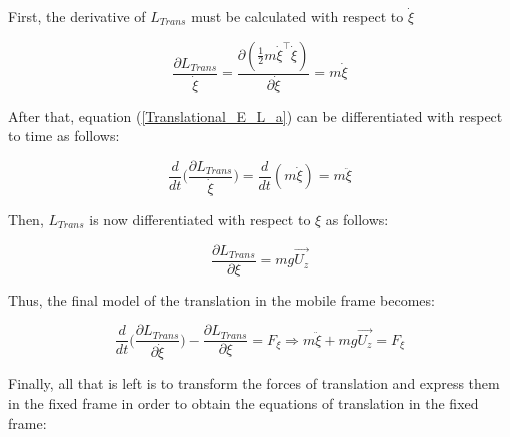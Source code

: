 \documentclass{thesisreport}
\begin{document}
First, the derivative of $L_{Trans}$ must be calculated with respect to $\dot{\xi}$

\begin{equation}\label{Translational_E_L_a}
	\frac{\partial L_{Trans}}{\dot{\xi}} = \frac{\partial (\frac{1}{2} m \dot{\xi}^{\intercal} \dot{\xi})}{\partial \dot{\xi}}= m \dot{\xi}
\end{equation}

After that, equation (\ref{Translational_E_L_a}) can be differentiated with respect to time as follows: 

\begin{equation}
	\frac{d}{dt}\bigg( \frac{\partial L_{Trans}}{\dot{\xi}} \bigg) = \frac{d}{dt}(m \dot{\xi}) = m \ddot{\xi}
\end{equation} 

Then, $L_{Trans}$ is now differentiated with respect to $\xi$ as follows:

\begin{equation}
	\frac{\partial L_{Trans}}{\partial \xi}=mg\overrightarrow{U_z}
\end{equation}

\newpage

Thus, the final model of the translation in the mobile frame becomes:

\begin{equation}
	\frac{d}{dt}\bigg( \frac{\partial L_{Trans}}{\partial \dot{\xi}} \bigg) - \frac{\partial L_{Trans}}{\partial \xi} = F_{\xi} \Rightarrow m\ddot{\xi} + mg \overrightarrow{U_z} = F_{\xi}
\end{equation}

Finally, all that is left is to transform the forces of translation and express them in the fixed frame in order to obtain the equations of translation in the fixed frame:
\end{document}
